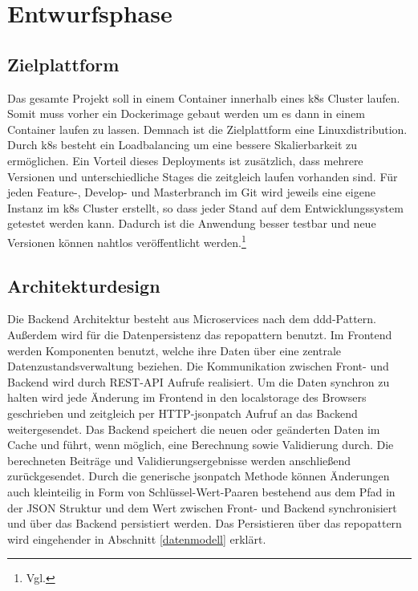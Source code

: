 \section{Entwurfsphase}
\label{entwurfsphase}
\subsection{Zielplattform}
\label{zielplattform}
Das gesamte Projekt soll in einem \gls{Container} innerhalb eines \gls{k8s} Cluster laufen. Somit muss vorher ein Dockerimage gebaut werden um es dann in einem Container laufen zu lassen. Demnach ist die Zielplattform eine Linuxdistribution. Durch \gls{k8s} besteht ein Loadbalancing um eine bessere Skalierbarkeit zu ermöglichen. Ein Vorteil dieses Deployments ist zusätzlich, dass mehrere Versionen und unterschiedliche Stages die zeitgleich laufen vorhanden sind. Für jeden Feature-, Develop- und Masterbranch im Git wird jeweils eine eigene Instanz im \gls{k8s} Cluster erstellt, so dass jeder Stand auf dem Entwicklungssystem getestet werden kann. Dadurch ist die Anwendung besser testbar und neue Versionen können nahtlos veröffentlicht werden.\footnote{Vgl.\cite{GitlabKubernetes2021}}
\subsection{Architekturdesign}
\label{architekturdesign}
Die Backend Architektur besteht aus Microservices nach dem \gls{ddd}-Pattern. Außerdem wird für die Datenpersistenz das \gls{repopattern} benutzt. Im Frontend werden Komponenten benutzt, welche ihre Daten über eine zentrale Datenzustandsverwaltung beziehen. Die Kommunikation zwischen Front- und Backend wird durch REST-API Aufrufe realisiert. Um die Daten synchron zu halten wird jede Änderung im Frontend in den \gls{localstorage} des Browsers geschrieben und zeitgleich per \gls{HTTP}-\gls{jsonpatch} Aufruf an das Backend weitergesendet. Das Backend speichert die neuen oder geänderten Daten im Cache und führt, wenn möglich, eine Berechnung sowie Validierung durch. Die berechneten Beiträge und Validierungsergebnisse werden anschließend zurückgesendet. Durch die generische \gls{jsonpatch} Methode können Änderungen auch kleinteilig in Form von Schlüssel-Wert-Paaren bestehend aus dem Pfad in der JSON Struktur und dem Wert zwischen Front- und Backend synchronisiert und über das Backend persistiert werden. Das Persistieren über das \gls{repopattern} wird eingehender in Abschnitt \ref{datenmodell}  erklärt.
